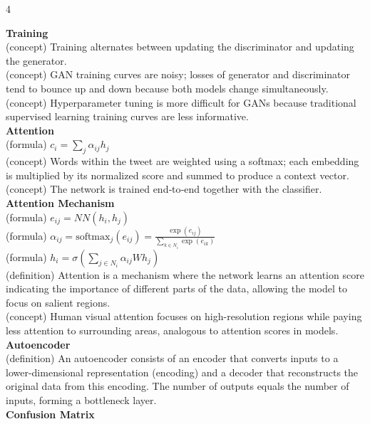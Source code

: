 \documentclass[8pt]{extarticle}
\begin{document}
\scriptsize
\begin{multicols}{4}

\vspace{2pt}\textbf{Training}\\
(concept) Training alternates between updating the discriminator and updating the generator.\\
(concept) GAN training curves are noisy; losses of generator and discriminator tend to bounce up and down because both models change simultaneously.\\
(concept) Hyperparameter tuning is more difficult for GANs because traditional supervised learning training curves are less informative.\\
\vspace{2pt}\textbf{Attention}\\
(formula) $c_i = \sum_{j} \alpha_{ij} h_j$\\
(concept) Words within the tweet are weighted using a softmax; each embedding is multiplied by its normalized score and summed to produce a context vector.\\
(concept) The network is trained end‑to‑end together with the classifier.\\
\vspace{2pt}\textbf{Attention Mechanism}\\
(formula) $e_{ij} = NN(h_i, h_j)$\\
(formula) $\alpha_{ij} = \text{softmax}_j(e_{ij}) = \frac{\exp(e_{ij})}{\sum_{k \in N_i} \exp(e_{ik})}$\\
(formula) $h_i = \sigma\left( \sum_{j \in N_i} \alpha_{ij} W h_j \right)$\\
(definition) Attention is a mechanism where the network learns an attention score indicating the importance of different parts of the data, allowing the model to focus on salient regions.\\
(concept) Human visual attention focuses on high-resolution regions while paying less attention to surrounding areas, analogous to attention scores in models.\\
\vspace{2pt}\textbf{Autoencoder}\\
(definition) An autoencoder consists of an encoder that converts inputs to a lower-dimensional representation (encoding) and a decoder that reconstructs the original data from this encoding. The number of outputs equals the number of inputs, forming a bottleneck layer.\\
\vspace{2pt}\textbf{Confusion Matrix}\\

\end{multicols}
\end{document}
